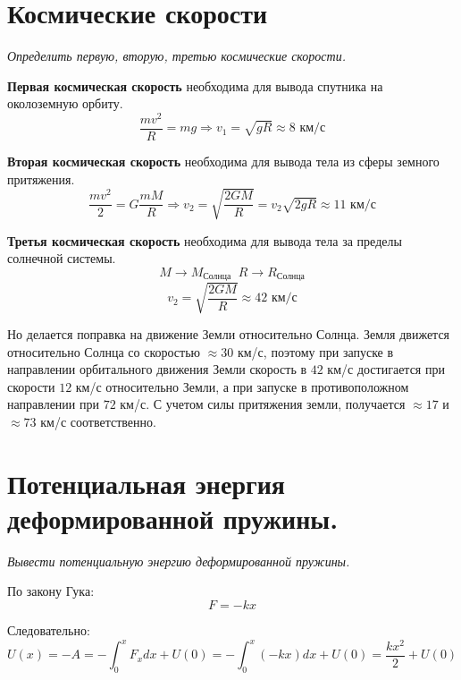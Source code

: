 \documentclass{article}
\begin{document}
   \section{Космические скорости}
    \par
      \textit{Определить первую, вторую, третью космические скорости.}\\
    \par     
      \textbf{Первая космическая скорость} необходима для вывода спутника на околоземную орбиту.
      \begin{equation}
	\frac{mv^2}{R}=mg\Rightarrow v_1=\sqrt{gR}\approx 8\text{ км/с}
      \end{equation}
    \par     
      \textbf{Вторая космическая скорость} необходима для вывода тела из сферы земного притяжения.
      \begin{equation}
	\frac{mv^2}{2}=G\frac{mM}{R}\Rightarrow v_2=\sqrt{\frac{2GM}{R}}=v_2\sqrt{2gR}\approx 11\text{ км/с}
      \end{equation}
    \par
      \textbf{Третья космическая скорость} необходима для вывода тела за пределы солнечной системы.
      \begin{equation}
	M\rightarrow M_\text{Солнца}\;\;R\rightarrow R_\text{Солнца}
      \end{equation}
      \begin{equation}
	v_2=\sqrt{\frac{2GM}{R}}\approx42\text{ км/с}
      \end{equation}
    \par
      Но делается поправка на движение Земли относительно Солнца. Земля движется относительно Солнца со скоростью $\approx 30$ км/с, поэтому при запуске в направлении орбитального движения Земли скорость в $42$ км/с достигается при скорости $12$ км/с относительно Земли, а при запуске в противоположном направлении при $72$ км/с. С учетом силы притяжения земли, получается $\approx17$ и $\approx73$ км/с соответственно.
  \clearpage
  
   \section{Потенциальная энергия деформированной пружины.}
    \par
      \textit{Вывести потенциальную энергию деформированной пружины.}\\
    \par   
      По закону Гука:
      \begin{equation}
	F=-kx
      \end{equation}
    \par
      Следовательно:
      \begin{equation}
	U(x)=-A=-\int^x_0F_xdx+U(0)=-\int^x_0(-kx)dx+U(0)=\frac{kx^2}{2}+U(0)
      \end{equation}
  \clearpage
  
\end{document}
